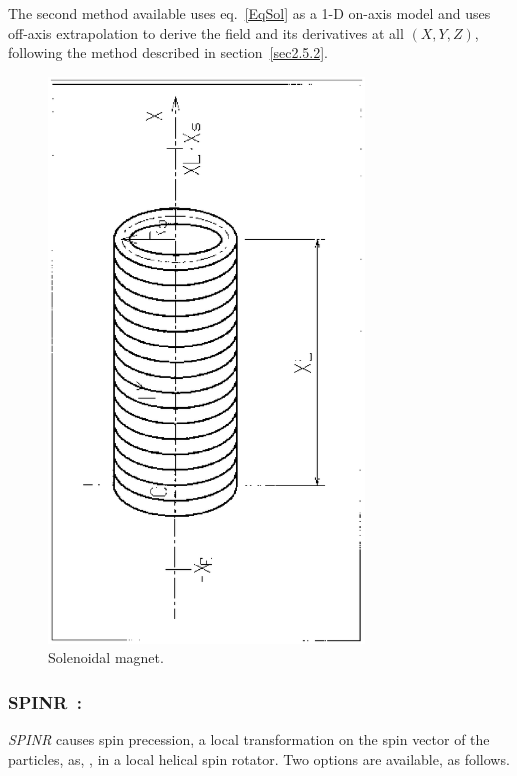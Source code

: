 {\bigskip

  The second method available uses eq.~\ref{EqSol} as a 1-D on-axis model and uses off-axis 
extrapolation to derive the field  and its derivatives at all $(X,Y,Z)$, following the method 
described in section~\ref{sec2.5.2}. 


\vfill

\begin{figure}[H]
\centerline{\includegraphics[height=15cm,angle=-90]{Fig30.ps}}
\caption{\label{fig30} Solenoidal magnet.}
\end{figure}
\vfill




\newpage

\subsubsection*{SPINR~: \SPINRTitl~\cite{SPINR}  } \label{SPINR}  
\medskip

\textsl{SPINR} causes spin precession, a local transformation on the spin vector of the particles, 
 as, \eg, in a local helical spin rotator.  Two options are 
available, as follows. 

}
